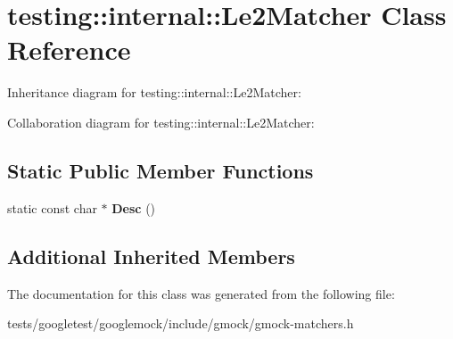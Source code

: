 \hypertarget{classtesting_1_1internal_1_1Le2Matcher}{}\section{testing\+:\+:internal\+:\+:Le2\+Matcher Class Reference}
\label{classtesting_1_1internal_1_1Le2Matcher}


Inheritance diagram for testing\+:\+:internal\+:\+:Le2\+Matcher\+:


Collaboration diagram for testing\+:\+:internal\+:\+:Le2\+Matcher\+:
\subsection*{Static Public Member Functions}
\begin{DoxyCompactItemize}
\item 
\mbox{\label{classtesting_1_1internal_1_1Le2Matcher_a92e2aca3f09bb687895b10c272cb392f}} 
static const char $\ast$ {\bfseries Desc} ()
\end{DoxyCompactItemize}
\subsection*{Additional Inherited Members}


The documentation for this class was generated from the following file\+:\begin{DoxyCompactItemize}
\item 
tests/googletest/googlemock/include/gmock/gmock-\/matchers.\+h\end{DoxyCompactItemize}
